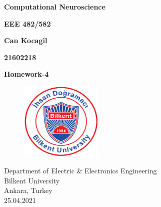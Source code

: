 \documentclass[12pt]{amsart}
\begin{document}
\begin{titlepage}
   \begin{center}
       \vspace*{1cm}

       \textbf{Computational Neuroscience}

       \vspace{0.7cm}
        \textbf{EEE 482/582}
            
       \vspace{0.7cm}

       \textbf{Can Kocagil} 
       
       \vspace{0.7cm}
       \textbf{21602218}

       \vspace{0.7cm}
            
       \textbf{Homework-4}
            
       \vspace{0.8cm}
         \begin{figure}[h]
            \centering
            \includegraphics[width = 0.35\textwidth]{images/bilkent_logo.png}
        \end{figure}
       \vspace{0.7cm}  
       Department of Electric \& Electronics Engineering \\
       \vspace{0.7cm}
       Bilkent University\\
       \vspace{0.7cm}
       Ankara, Turkey \\
       \vspace{0.7cm}
       25.04.2021
            
   \end{center}
\end{titlepage}

\tableofcontents
\end{document}
